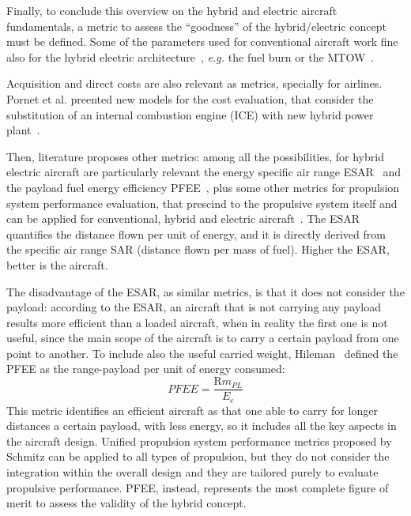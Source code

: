 Finally, to conclude this overview on the hybrid and electric aircraft fundamentals, a metric to assess the ``goodness'' of the hybrid/electric concept must be defined.
Some of the parameters used for conventional aircraft work fine also for the hybrid electric architecture~\cite{bib:brelje_biblio}, \textit{e.g.} the fuel burn or the MTOW~\cite{bib:roskam_partVIII, bib:thorbeck}. 

Acquisition and direct costs are also relevant as metrics, specially for airlines. 
Pornet et al. preented new models for the cost evaluation, that consider the substitution of an internal combustion engine (ICE) with new hybrid power plant~\cite{bib:pornet_cost}.

Then, literature proposes other metrics: among all the possibilities, for hybrid electric aircraft are particularly relevant the energy specific air range ESAR~\cite{bib:pornet_cost, bib:ploetner} and the payload fuel energy efficiency PFEE~\cite{bib:hileman}, plus some other metrics for propulsion system performance evaluation, that prescind to the propulsive system itself and can be applied for conventional, hybrid and electric aircraft~\cite{bib:schmitz_2013}.
The ESAR quantifies the distance flown per unit of energy, and it is directly derived from the specific air range SAR (distance flown per mass of fuel). Higher the ESAR, better is the aircraft. 

The disadvantage of the ESAR, as similar metrics, is that it does not consider the payload: according to the ESAR, an aircraft that is not carrying any payload results more efficient than a loaded aircraft, when in reality the first one is not useful, since the main scope of the aircraft is to carry a certain payload from one point to another. 
To include also the useful carried weight, Hileman~\cite{bib:hileman} defined the PFEE as the range-payload per unit of energy consumed: 
\begin{equation}
	\label{eq:pfee}
	PFEE = \frac{\textrm{R} m_{PL}}{E_c}
\end{equation} 
This metric identifies an efficient aircraft as that one able to carry for longer distances a certain payload, with less energy, so it includes all the key aspects in the aircraft design. 
Unified propulsion system performance metrics proposed by Schmitz can be applied to all types of propulsion, but they do not consider the integration within the overall design and they are tailored purely to evaluate propulsive performance.
PFEE, instead, represents the most complete figure of merit to assess the validity of the hybrid concept.

